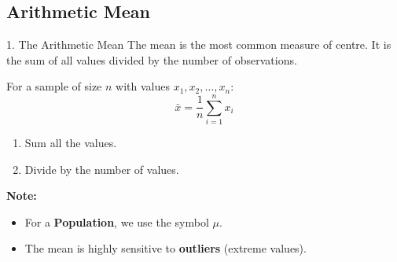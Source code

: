 \subsection{Arithmetic Mean}
\begin{frame}{1. The Arithmetic Mean}
    The mean is the most common measure of centre. It is the sum of all values divided by the number of observations.

    \begin{definition}
        For a sample of size $n$ with values $x_1, x_2, \dots, x_n$:
        \begin{equation}
            \bar{x} = \frac{1}{n} \sum_{i=1}^{n} x_i
        \end{equation}
    \end{definition}
    
    \begin{recipe}
        \begin{enumerate}
            \item Sum all the values.
            \item Divide by the number of values.
        \end{enumerate}
    \end{recipe}

    \textbf{Note:}
    \begin{itemize}
        \item For a \textbf{Population}, we use the symbol $\mu$.
        \item The mean is highly sensitive to \textbf{outliers} (extreme values).
    \end{itemize}
\end{frame}

